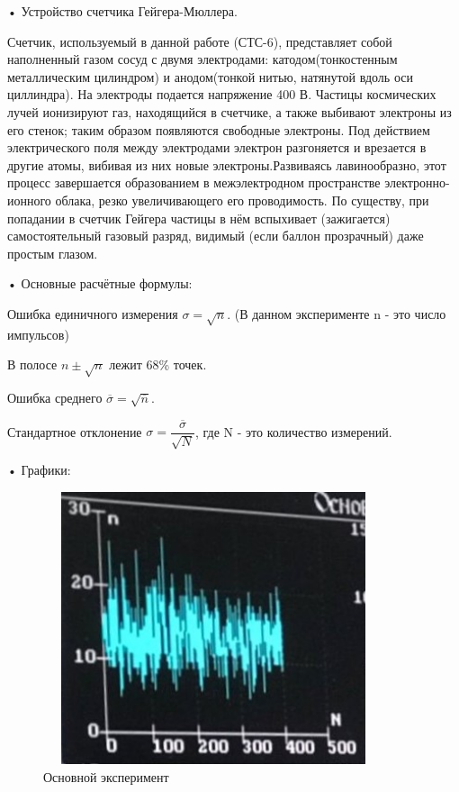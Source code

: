 \documentclass[a4paper,14pt]{extarticle}
\begin{document}
	
	• Устройство счетчика Гейгера-Мюллера.
	\newline
	
	Счетчик, используемый в данной работе (СТС-6), представляет собой  наполненный газом сосуд с двумя электродами:
	катодом(тонкостенным металлическим цилиндром) и анодом(тонкой нитью, натянутой вдоль оси циллиндра).
	На электроды подается напряжение 400 В.
	Частицы космических лучей ионизируют газ, находящийся в счетчике, а также выбивают электроны из его стенок; таким образом появляются свободные электроны. Под действием электрического поля между электродами электрон разгоняется и врезается в другие атомы, вибивая из них новые электроны.Развиваясь лавинообразно, этот процесс завершается образованием в межэлектродном пространстве электронно-ионного облака, резко увеличивающего его проводимость. По
	существу, при попадании в счетчик Гейгера частицы в нём вспыхивает (зажигается) самостоятельный
	газовый разряд, видимый (если баллон прозрачный) даже простым глазом.
	\newline
	
	
	
	
	• Основные расчётные формулы:
	\newline
	
	Ошибка единичного измерения $\sigma = \sqrt{n}$. (В данном эксперименте n - это число импульсов)
	
	В полосе $n\pm\sqrt{n}$ лежит 68\% точек.
	
	Ошибка среднего $\overline{\sigma} = \sqrt{\overline{n}}$.
	
	Стандартное отклонение $\sigma = \dfrac{\overline{\sigma}}{\sqrt{N}}$, где N - это количество измерений.
	\newline
	
	
	\newpage
	
	
	• Графики:
	\newline
	
	\begin{figure}
		\includegraphics[width= 10cm, height= 8cm]{1.jpg}
		\caption{Основной эксперимент}
	\end{figure}
\end{document}
